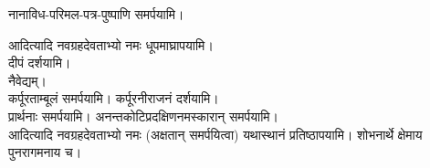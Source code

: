 नानाविध-परिमल-पत्र-पुष्पाणि समर्पयामि।

आदित्यादि नवग्रहदेवताभ्यो नमः धूपमाघ्रापयामि।\\
दीपं दर्शयामि।\\
नैवेद्यम्। \\
कर्पूरताम्बूलं समर्पयामि। कर्पूरनीराजनं दर्शयामि।\\
प्रार्थनाः समर्पयामि।
अनन्तकोटिप्रदक्षिणनमस्कारान् समर्पयामि।\\

आदित्यादि नवग्रहदेवताभ्यो नमः (अक्षतान् समर्पयित्वा) यथास्थानं प्रतिष्ठापयामि। शोभनार्थे क्षेमाय पुनरागमनाय च।
